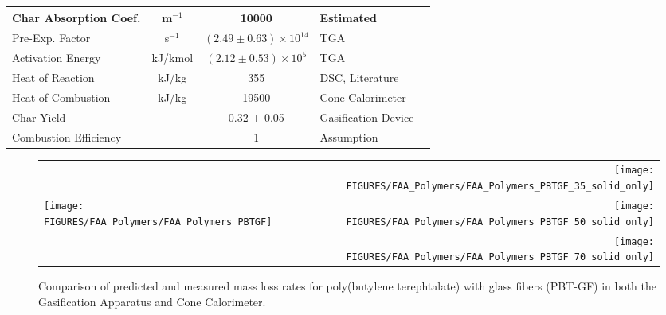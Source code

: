 \begin{table}[h!]
\begin{center}
\begin{tabular}{|l|c|c|l|l|}
Char Absorption Coef.   &      m$^{-1}$ &       10000                       & Estimated                                 & \cite{Kempel:1}               \\ \hline
Pre-Exp. Factor         &      s$^{-1}$ & $(2.49 \pm 0.63) \times 10^{14}$  & TGA                                       & \cite{Kempel:1}               \\ \hline
Activation Energy       &    kJ/kmol    & $(2.12 \pm 0.53) \times 10^{5}$   & TGA                                       & \cite{Kempel:1}               \\ \hline
Heat of Reaction        &      kJ/kg    &        355                        & DSC, Literature                           & \cite{Kempel:1,Lyon:Ency2005} \\ \hline
Heat of Combustion      &      kJ/kg    & 19500                             & Cone Calorimeter                          & \cite{Kempel:1}               \\ \hline
Char Yield              &               & 0.32 $\pm$ 0.05                   & Gasification Device                       & \cite{Kempel:1}               \\ \hline
Combustion Efficiency   &               &          1                        & Assumption                                & \cite{Kempel:1}               \\ \hline
\end{tabular}
\end{center}
\label{Properties_PBT-GF}
\end{table}

\begin{figure}[h!]
\begin{tabular*}{\textwidth}{l@{\extracolsep{\fill}}r}
 &
\texttt{[image: FIGURES/FAA\_Polymers/FAA\_Polymers\_PBTGF\_35\_solid\_only]} \\
\texttt{[image: FIGURES/FAA\_Polymers/FAA\_Polymers\_PBTGF]} &
\texttt{[image: FIGURES/FAA\_Polymers/FAA\_Polymers\_PBTGF\_50\_solid\_only]} \\
 &
\texttt{[image: FIGURES/FAA\_Polymers/FAA\_Polymers\_PBTGF\_70\_solid\_only]}
\end{tabular*}
\caption[Mass loss rate of poly(butylene terephtalate) with glass fibers (PBT-GF).]
{Comparison of predicted and measured mass loss rates for poly(butylene terephtalate) with glass fibers (PBT-GF) in both the Gasification Apparatus and Cone Calorimeter.}
\label{HRR_PBTGF}
\end{figure}


